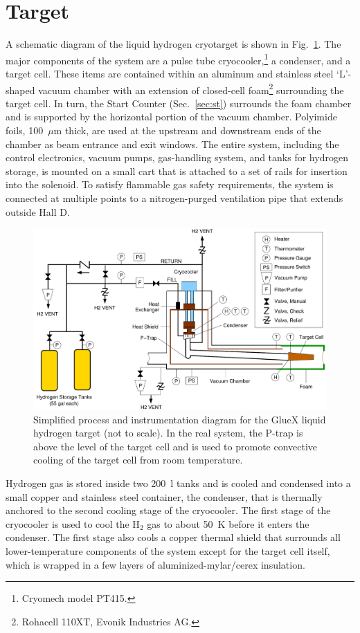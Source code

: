 \section[Target]{Target \label{sec:target} }
A schematic diagram of the \gx{} liquid hydrogen cryotarget is shown in Fig.~\ref{fig:Target}. The major components of the system are a pulse tube cryocooler,\footnote{Cryomech model PT415.} a condenser, and a target cell.  These items are contained within an aluminum and stainless steel `L'-shaped vacuum chamber with an extension of closed-cell foam\footnote{Rohacell 110XT, Evonik Industries AG.} surrounding the target cell. In turn, the \gx{} Start Counter (Sec.~\ref{sec:st}) surrounds the foam chamber and is supported by the horizontal portion of the vacuum chamber. Polyimide foils, 100~$\mu$m thick, are used at the upstream and downstream ends of the chamber as beam entrance and exit windows. The entire system, including the control electronics, vacuum pumps, gas-handling system, and tanks for hydrogen storage, is mounted on a small cart that is attached to a set of rails for insertion into the \gx{} solenoid.  To satisfy flammable gas safety requirements, the system is connected at multiple points to a nitrogen-purged ventilation pipe that extends outside Hall D.
\begin{figure}
\begin{center}
\includegraphics[width=4.5in]{figures/TargetSchematic3.pdf}
\end{center}
\caption{Simplified process and instrumentation diagram for the GlueX liquid hydrogen target (not to scale).
In the real system, the P-trap is above the level of the target cell and is used to
promote convective cooling of the target cell from room temperature.}
\label{fig:Target}
\end{figure}

Hydrogen gas is stored inside two 200~l tanks and
is cooled and condensed into a small copper and stainless steel container,
the condenser, that is thermally anchored to the second cooling stage of the cryocooler. 
The first stage of the cryocooler is used to
cool the H$_2$ gas to about 50~K before it enters the condenser.
The first stage also cools a copper thermal shield that surrounds all
lower-temperature components of the system except for the
target cell itself, which is wrapped in a few layers of aluminized-mylar/cerex insulation.

